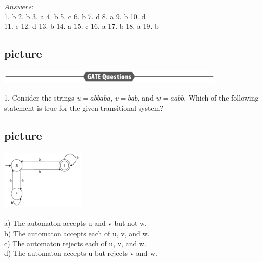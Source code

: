 $Answers:$ \\
1. b    \hspace*{0.3cm}    2. b    \hspace*{0.3cm}   3. a     \hspace*{0.3cm}    4. b     \hspace*{0.3cm}    5. c     \hspace*{0.3cm}     6. b     \hspace*{0.3cm}     7. d       \hspace*{0.3cm}       8. a      \hspace*{0.3cm}    9. b      \hspace*{0.3cm}     10. d \\
11. c    \hspace*{0.3cm}    12. d     \hspace*{0.3cm}    13. b      \hspace*{0.3cm}    14. a      \hspace*{0.3cm}    15. c    \hspace*{0.3cm}     16. a     \hspace*{0.3cm}    17. b      \hspace*{0.3cm}       18. a     \hspace*{0.3cm}    19. b \\ 

\begin{center}
	\section{picture}
	\includegraphics[width=11cm,height=0.7cm]{./pictures/120.png}
\end{center}

1. Consider the strings $u = abbaba$, $v = bab$, and $w = aabb$. Which of the following statement is true
for the given transitional system?\\
\begin{center}
	\section{picture}
	\includegraphics[width=4cm,height=3cm]{./pictures/120-1.png}
\end{center}

\vspace*{0.1cm}
a) The automaton accepts u and v but not w.\\
b) The automaton accepts each of u, v, and w.\\
c) The automaton rejects each of u, v, and w.\\
d) The automaton accepts u but rejects v and w.\\